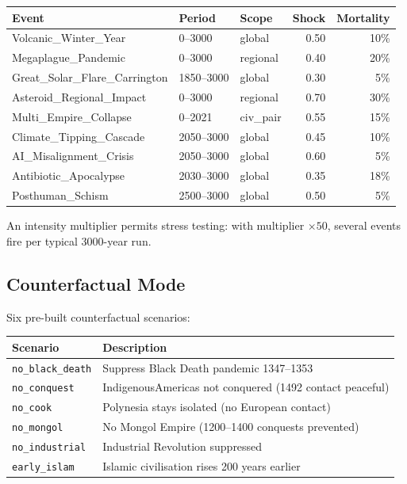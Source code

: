 \begin{center}
\small
\begin{tabular}{lllrr}
\toprule
Event & Period & Scope & Shock & Mortality \\
\midrule
Volcanic\_Winter\_Year       & 0--3000  & global    & 0.50 & 10\% \\
Megaplague\_Pandemic         & 0--3000  & regional  & 0.40 & 20\% \\
Great\_Solar\_Flare\_Carrington & 1850--3000 & global & 0.30 & 5\% \\
Asteroid\_Regional\_Impact   & 0--3000  & regional  & 0.70 & 30\% \\
Multi\_Empire\_Collapse      & 0--2021  & civ\_pair & 0.55 & 15\% \\
Climate\_Tipping\_Cascade    & 2050--3000 & global  & 0.45 & 10\% \\
AI\_Misalignment\_Crisis     & 2050--3000 & global  & 0.60 & 5\% \\
Antibiotic\_Apocalypse       & 2030--3000 & global  & 0.35 & 18\% \\
Posthuman\_Schism            & 2500--3000 & global  & 0.50 & 5\% \\
\bottomrule
\end{tabular}
\end{center}

An intensity multiplier permits stress testing: with multiplier
$\times 50$, several events fire per typical 3000-year run.

\subsection{Counterfactual Mode}
\label{subsec:counterfactual}

Six pre-built counterfactual scenarios:

\begin{center}
\small
\begin{tabular}{ll}
\toprule
Scenario & Description \\
\midrule
\texttt{no\_black\_death}  & Suppress Black Death pandemic 1347--1353 \\
\texttt{no\_conquest}      & IndigenousAmericas not conquered (1492 contact peaceful) \\
\texttt{no\_cook}          & Polynesia stays isolated (no European contact) \\
\texttt{no\_mongol}        & No Mongol Empire (1200--1400 conquests prevented) \\
\texttt{no\_industrial}    & Industrial Revolution suppressed \\
\texttt{early\_islam}      & Islamic civilisation rises 200 years earlier \\
\bottomrule
\end{tabular}
\end{center}

